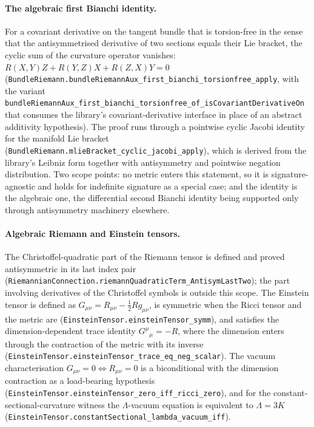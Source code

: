\documentclass[aps,prd,nofootinbib,superscriptaddress,12pt]{revtex4-2}
\DeclareRobustCommand{\lb}{\discretionary{}{}{}}
\begin{document}
\paragraph{The algebraic first Bianchi identity.}
For a covariant derivative on the tangent bundle that is torsion-free in the
sense that the antisymmetrised derivative of two sections equals their Lie
bracket, the cyclic sum of the curvature operator vanishes:
$R(X,Y)Z + R(Y,Z)X + R(Z,X)Y = 0$
(\texttt{Bundle\lb{}Riemann.\lb{}bundle\lb{}Riemann\lb{}Aux\_\lb{}first\_\lb{}bianchi\_\lb{}torsionfree\_\lb{}apply}, with
the variant \texttt{bundle\lb{}Riemann\lb{}Aux\_\lb{}first\_\lb{}bianchi\_\lb{}torsionfree\_\lb{}of\_\lb{}is\lb{}Covariant\lb{}Derivative\lb{}On}
that consumes the library's covariant-derivative interface in place of an
abstract additivity hypothesis). The proof runs through a pointwise cyclic Jacobi
identity for the manifold Lie bracket
(\texttt{Bundle\lb{}Riemann.\lb{}mlie\lb{}Bracket\_\lb{}cyclic\_\lb{}jacobi\_\lb{}apply}), which is derived from
the library's Leibniz form together with antisymmetry and pointwise negation
distribution. Two scope points: no metric enters this statement, so it is
signature-agnostic and holds for indefinite signature as a special case; and the
identity is the algebraic one, the differential second Bianchi identity being
supported only through antisymmetry machinery elsewhere.

\paragraph{Algebraic Riemann and Einstein tensors.}
The Christoffel-quadratic part of the Riemann tensor is defined and proved
antisymmetric in its last index pair
(\texttt{Riemannian\lb{}Connection.\lb{}riemann\lb{}Quadratic\lb{}Term\_\lb{}Antisym\lb{}Last\lb{}Two}); the part
involving derivatives of the Christoffel symbols is outside this scope. The
Einstein tensor is defined as $G_{\mu\nu} = R_{\mu\nu} - \tfrac{1}{2} R
g_{\mu\nu}$, is symmetric when the Ricci tensor and the metric are
(\texttt{Einstein\lb{}Tensor.\lb{}einstein\lb{}Tensor\_\lb{}symm}), and satisfies the
dimension-dependent trace identity $G^{\mu}{}_{\mu} = -R$, where the dimension
enters through the contraction of the metric with its inverse
(\texttt{Einstein\lb{}Tensor.\lb{}einstein\lb{}Tensor\_\lb{}trace\_\lb{}eq\_\lb{}neg\_\lb{}scalar}). The vacuum
characterisation $G_{\mu\nu} = 0 \Leftrightarrow R_{\mu\nu} = 0$ is a
biconditional with the dimension contraction as a load-bearing hypothesis
(\texttt{Einstein\lb{}Tensor.\lb{}einstein\lb{}Tensor\_\lb{}zero\_\lb{}iff\_\lb{}ricci\_\lb{}zero}), and for the
constant-sectional-curvature witness the $\Lambda$-vacuum equation is equivalent
to $\Lambda = 3K$ (\texttt{Einstein\lb{}Tensor.\lb{}constant\lb{}Sectional\_\lb{}lambda\_\lb{}vacuum\_\lb{}iff}).
\end{document}
